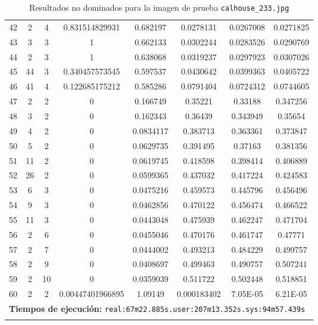\begin{longtable}{|c|c|c|c|c|c|c|c|}
42 & 2 & 4 & 0.831514829931 & 0.682197 & 0.0278131 & 0.0267008 & 0.0271825 \\
43 & 3 & 3 & 1 & 0.662133 & 0.0302244 & 0.0283526 & 0.0290769 \\
44 & 2 & 3 & 1 & 0.638068 & 0.0319237 & 0.0297923 & 0.0307026 \\
45 & 44 & 3 & 0.340457573545 & 0.597537 & 0.0430642 & 0.0399363 & 0.0405722 \\
46 & 41 & 4 & 0.122685175212 & 0.585286 & 0.0791404 & 0.0724312 & 0.0744605 \\
47 & 2 & 2 & 0 & 0.166749 & 0.35221 & 0.33188 & 0.347256 \\
48 & 3 & 2 & 0 & 0.162343 & 0.36439 & 0.343949 & 0.35654 \\
49 & 4 & 2 & 0 & 0.0834117 & 0.383713 & 0.363361 & 0.373847 \\
50 & 5 & 2 & 0 & 0.0629735 & 0.391495 & 0.37163 & 0.381356 \\
51 & 11 & 2 & 0 & 0.0619745 & 0.418598 & 0.398414 & 0.406889 \\
52 & 26 & 2 & 0 & 0.0599365 & 0.437032 & 0.417224 & 0.424583 \\
53 & 6 & 3 & 0 & 0.0475216 & 0.459573 & 0.445796 & 0.456496 \\
54 & 9 & 3 & 0 & 0.0462856 & 0.470122 & 0.456474 & 0.466522 \\
55 & 11 & 3 & 0 & 0.0443048 & 0.475939 & 0.462247 & 0.471704 \\
56 & 2 & 6 & 0 & 0.0455046 & 0.470176 & 0.461747 & 0.47771 \\
57 & 2 & 7 & 0 & 0.0444002 & 0.493213 & 0.484229 & 0.499757 \\
58 & 2 & 9 & 0 & 0.0408697 & 0.499463 & 0.490757 & 0.507241 \\
59 & 2 & 10 & 0 & 0.0359039 & 0.511722 & 0.502448 & 0.518851 \\
60 & 2 & 2 & 0.00447401966895 & 1.09149 & 0.000183402 & 7.05E-05 & 6.21E-05 \\
\hline
\multicolumn{8}{|c|}{\textbf{Tiempos de ejecución:} \texttt{real:67m22.885s.user:207m13.352s.sys:94m57.439s
}}\\  \hline
\caption{Resultados no dominados para la imagen de prueba \texttt{calhouse\_233.jpg}}
\label{tab:calhouse_233}
\end{longtable}
\normalsize

